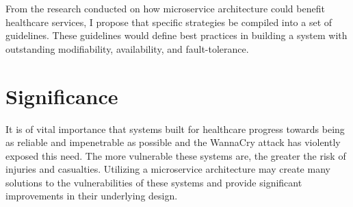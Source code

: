 \documentclass[10pt, oneside, letterpaper]{article}
\begin{document}
\begin{multicols}{2}
	From the research conducted on how microservice architecture could benefit healthcare services, I propose that specific strategies be compiled into a set of guidelines. These guidelines would define best practices in building a system with outstanding modifiability, availability, and fault-tolerance.

	\section{Significance}

	It is of vital importance that systems built for healthcare progress towards being as reliable and impenetrable as possible and the WannaCry attack has violently exposed this need. The more vulnerable these systems are, the greater the risk of injuries and casualties. Utilizing a microservice architecture may create many solutions to the vulnerabilities of these systems and provide significant improvements in their underlying design.

	\end{multicols}

	{\RaggedRight
		
		
	}
\end{document}
